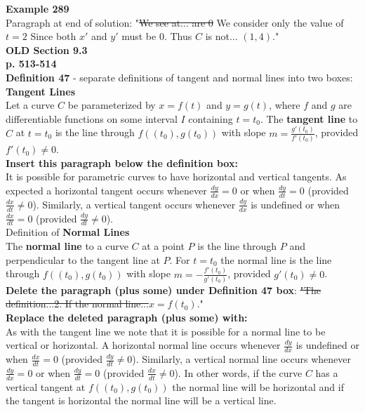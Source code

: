 \documentclass[11pt]{report}
\begin{document}
\textbf{Example 289}\\
Paragraph at end of solution: "\sout{We see at... are 0} We consider only the value of $t=2$ Since both $x'$ and $y'$ must be 0. Thus $C$ is not... $(1,4)$."\\

\textbf{OLD Section 9.3}\\

\textbf{p. 513-514}\\
\textbf{Definition 47} - separate definitions of tangent and normal lines into two boxes:\\
\textbf{Tangent Lines}\\
Let a curve $C$ be parameterized by $x=f(t)$ and $y=g(t)$, where $f$ and $g$ are differentiable functions on some interval $I$ containing $t=t_0$. The 
\textbf{tangent line} to $C$ at $t=t_0$ is the line through $f((t_0),g(t_0))$ with slope $m=\frac{g'(t_0)}{f'(t_0)}$, provided $f'(t_0) \neq 0$.\\

\textbf{Insert this paragraph below the definition box:}\\
It is possible for parametric curves to have horizontal and vertical tangents. As expected a horizontal tangent occurs whenever $\frac{dy}{dx} = 0$ or when $\frac{dy}{dt} = 0$ (provided $\frac{dx}{dt} \neq 0$). Similarly, a vertical tangent occurs whenever $\frac{dy}{dx}$ is undefined or when $\frac{dx}{dt} = 0$ (provided $\frac{dy}{dt} \neq 0$).\\

Definition of \textbf{Normal Lines}\\
The \textbf{normal line} to a curve $C$ at a point $P$ is the line through $P$ and perpendicular to the tangent line at $P$. For $t=t_0$ the normal line is the line through $f((t_0), g(t_0))$ with slope $m=-\frac{f'(t_0)}{g'(t_0)}$, provided $g'(t_0) \neq 0$.\\

\textbf{Delete the paragraph (plus some) under Definition 47 box}: \sout{"The definition...2. If the normal line...$x=f(t_0)$}." \\

\textbf{Replace the deleted paragraph (plus some) with:}\\
As with the tangent line we note that it is possible for a normal line to be vertical or horizontal. A horizontal normal line occurs whenever $\frac{dy}{dx}$ is undefined or when $\frac{dx}{dt} = 0$ (provided $\frac{dy}{dt} \neq 0$). Similarly, a vertical normal line occurs whenever $\frac{dy}{dx} = 0$ or when $\frac{dy}{dt} = 0$ (provided $\frac{dx}{dt} \neq 0$). In other words, if the curve $C$ has a vertical tangent  at $f((t_0), g(t_0))$ the normal line will be horizontal and if the tangent is horizontal the normal line will be a vertical line.\\
\end{document}
